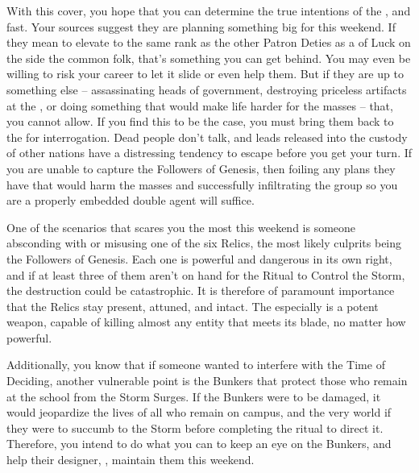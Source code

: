 \documentclass[char]{GL2020}
\begin{document}
With this cover, you hope that you can determine the true intentions of the \pGoaties{}, and fast. Your sources suggest they are planning something big for this weekend. If they mean to elevate \cGenesis{} to the same rank as the other Patron Deties as a \cGenesis{\Deity} of Luck on the side the common folk, that's something you can get behind. You may even be willing to risk your career to let it slide or even help them. But if they are up to something else -- assassinating heads of government, destroying priceless artifacts at the \pSchool{}, or doing something that would make life harder for the masses -- that, you cannot allow. If you find this to be the case, you must bring them back to the \pFarm{} for interrogation. Dead people don't talk, and leads released into the custody of other nations have a distressing tendency to escape before you get your turn. If you are unable to capture the Followers of Genesis, then foiling any plans they have that would harm the masses and successfully infiltrating the group so you are a properly embedded double agent will suffice.

One of the scenarios that scares you the most this weekend is someone absconding with or misusing one of the six Relics, the most likely culprits being the Followers of Genesis. Each one is powerful and dangerous in its own right, and if at least three of them aren't on hand for the Ritual to Control the Storm, the destruction could be catastrophic. It is therefore of paramount importance that the Relics stay present, attuned, and intact. The \iScythe{} especially is a potent weapon, capable of killing almost any entity that meets its blade, no matter how powerful. 

Additionally, you know that if someone wanted to interfere with the Time of Deciding, another vulnerable point is the Bunkers that protect those who remain at the school from the Storm Surges. If the Bunkers were to be damaged, it would jeopardize the lives of all who remain on campus, and the very world if they were to succumb to the Storm before completing the ritual to direct it. Therefore, you intend to do what you can to keep an eye on the Bunkers, and help their designer, \cBunker{\full}, maintain them this weekend.
\end{document}
